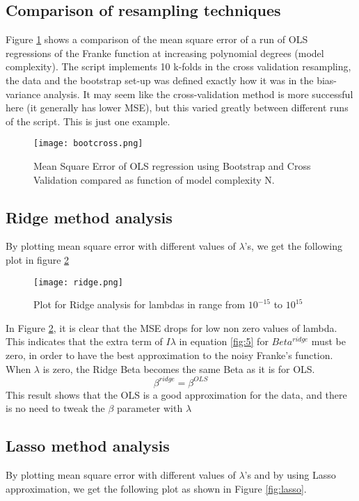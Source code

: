 \documentclass[reprint,english,notitlepage]{revtex4-1}  %
\begin{document}
\subsection{Comparison of resampling techniques}

Figure  \ref{fig:crossboot} shows a comparison of the mean square error of a run of OLS regressions of the Franke function at increasing polynomial degrees (model complexity). The script implements 10 k-folds in the cross validation resampling, the data and the bootstrap set-up was defined exactly how it was in the bias-variance analysis. It may seem like the cross-validation method is more successful here (it generally has lower MSE), but this varied greatly between different runs of the script. This is just one example.

\begin{figure}[h!]
    \centering
    \texttt{[image: bootcross.png]}
    \caption{Mean Square Error of OLS regression using Bootstrap and Cross Validation compared as function of model complexity N.}
    \label{fig:crossboot}
\end{figure}


\subsection{Ridge method analysis}
By plotting mean square error with different values of $\lambda$'s, we get the following plot in figure \ref{fig:ridge}

\begin{figure}[h!]
    \centering
    \texttt{[image: ridge.png]}
    \caption{Plot for Ridge analysis for lambdas in range from $10^{-15}$ to $10^{15}$}
    \label{fig:ridge}
\end{figure}

In Figure \ref{fig:ridge}, it is clear that the MSE drops for low non zero values of lambda. This indicates that the extra term of $I\lambda$ in equation \ref{fig:5} for $Beta^{ridge}$ must be zero, in order to have the best approximation to the noisy Franke's function. When $\lambda$ is zero, the Ridge Beta becomes the same Beta as it is for OLS. 
$$\beta^{ridge} = \beta^{OLS}$$
This result shows that the OLS is a good approximation for the data, and there is no need to tweak the $\beta$ parameter with $\lambda$

\subsection{Lasso method analysis}
By plotting mean square error with different values of $\lambda$'s and by using Lasso approximation, we get the following plot as shown in Figure \ref{fig:lasso}.
\end{document}
